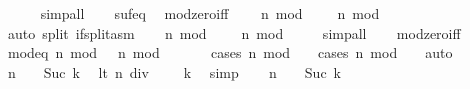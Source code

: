\begin{isabellebody}
\ \ \ \ \isamarkupfalse%
\ simp{\isacharunderscore}{\kern0pt}all\isanewline
\ \ \isamarkupfalse%
\ suf{\isacharunderscore}{\kern0pt}eq\ \isamarkupfalse%
\ mod{\isacharunderscore}{\kern0pt}zero{\isacharunderscore}{\kern0pt}iff{\isacharcolon}{\kern0pt}\isanewline
\ \ \ \ {\isachardoublequoteopen}n{}\ mod\ {}\ {\isacharequal}{\kern0pt}\ {}\ {\isasymlongleftrightarrow}\ n{}\ mod\ {}\ {\isacharequal}{\kern0pt}\ {}{\isachardoublequoteclose}\isanewline
\ \ \ \ \isamarkupfalse%
\ {\isacharparenleft}{\kern0pt}auto\ split{\isacharcolon}{\kern0pt}\ if{\isacharunderscore}{\kern0pt}split{\isacharunderscore}{\kern0pt}asm{\isacharparenright}{\kern0pt}\isanewline
\ \ \isamarkupfalse%
\ {\isachardoublequoteopen}n{}\ mod\ {}\ {\isacharless}{\kern0pt}\ {}{\isachardoublequoteclose}\ \ {\isachardoublequoteopen}n{}\ mod\ {}\ {\isacharless}{\kern0pt}\ {}{\isachardoublequoteclose}\ \isamarkupfalse%
\ simp{\isacharunderscore}{\kern0pt}all\isanewline
\ \ \isamarkupfalse%
\ mod{\isacharunderscore}{\kern0pt}zero{\isacharunderscore}{\kern0pt}iff\ \isamarkupfalse%
\ mod{\isacharunderscore}{\kern0pt}eq{\isacharcolon}{\kern0pt}\ {\isachardoublequoteopen}n{}\ mod\ {}\ {\isacharequal}{\kern0pt}\ n{}\ mod\ {}{\isachardoublequoteclose}\isanewline
\ \ \ \ \isamarkupfalse%
\ {\isacharparenleft}{\kern0pt}cases\ {\isachardoublequoteopen}n{}\ mod\ {}\ {\isacharequal}{\kern0pt}\ {}{\isachardoublequoteclose}{\isacharsemicolon}{\kern0pt}\ cases\ {\isachardoublequoteopen}n{}\ mod\ {}\ {\isacharequal}{\kern0pt}\ {}{\isachardoublequoteclose}{\isacharparenright}{\kern0pt}\ auto\isanewline
\ \ \isamarkupfalse%
\ {\isacartoucheopen}n{}\ {\isacharless}{\kern0pt}\ {}\ {\isacharcircum}{\kern0pt}\ Suc\ k{\isacartoucheclose}\ \isamarkupfalse%
\ lt{}{\isacharcolon}{\kern0pt}\ {\isachardoublequoteopen}n{}\ div\ {}\ {\isacharless}{\kern0pt}\ {}\ {\isacharcircum}{\kern0pt}\ k{\isachardoublequoteclose}\ \isamarkupfalse%
\ simp\isanewline
\ \ \isamarkupfalse%
\ {\isacartoucheopen}n{}\ {\isacharless}{\kern0pt}\ {}\ {\isacharcircum}{\kern0pt}\ Suc\ k{\isacartoucheclose}\ \isamarkupfalse%

\end{isabellebody}
